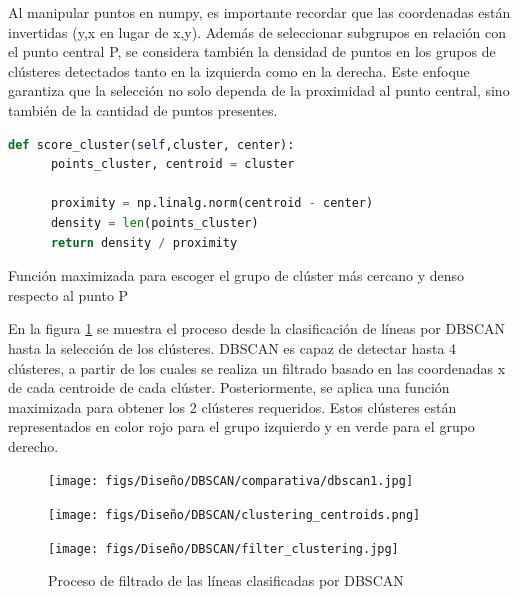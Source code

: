 Al manipular puntos en numpy, es importante recordar que las coordenadas están invertidas (y,x en lugar de x,y). Además de seleccionar subgrupos en relación con el punto central P, 
se considera también la densidad de puntos en los grupos de clústeres detectados tanto en la izquierda como en la derecha. Este enfoque garantiza que la selección no solo dependa 
de la proximidad al punto central, sino también de la cantidad de puntos presentes.  \newline
\begin{code}[h]
  \begin{lstlisting}[language=Python]
    def score_cluster(self,cluster, center):
      points_cluster, centroid = cluster
    
      proximity = np.linalg.norm(centroid - center)
      density = len(points_cluster)
      return density / proximity

  \end{lstlisting}
  \caption[Función maximizada para escoger el grupo de cluster más cercano y denso respecto al punto P]{Función maximizada para escoger el grupo de clúster más cercano y denso respecto al punto P}
  \label{cod:funcion_maximizada}
  \end{code}  
 
  En la figura \ref{fig:comparativa} se muestra el proceso desde la clasificación de líneas por DBSCAN hasta la selección de los clústeres. 
  DBSCAN es capaz de detectar hasta 4 clústeres, a partir de los cuales se realiza un filtrado basado en las coordenadas x de cada centroide de cada clúster. Posteriormente, 
  se aplica una función maximizada para obtener los 2 clústeres requeridos. Estos clústeres están representados en color rojo para el grupo izquierdo y en verde para el grupo 
  derecho. 
  \begin{figure}[H]
    \centering
    \begin{minipage}{0.3\textwidth}
      \texttt{[image: figs/Diseño/DBSCAN/comparativa/dbscan1.jpg]}
    \end{minipage}
    \hfill
    \begin{minipage}{0.3\textwidth}
      \texttt{[image: figs/Diseño/DBSCAN/clustering\_centroids.png]}
    \end{minipage}
    \hfill
    \begin{minipage}{0.3\textwidth}
      \texttt{[image: figs/Diseño/DBSCAN/filter\_clustering.jpg]}
    \end{minipage}
    \caption{Proceso de filtrado de las líneas clasificadas por DBSCAN}
    \label{fig:comparativa}
  \end{figure}

